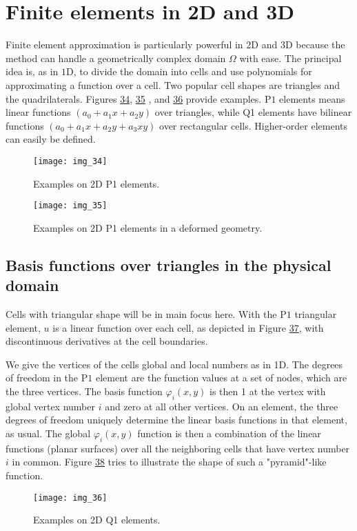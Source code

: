 \documentclass[../main.tex]{subfiles}
\begin{document}
\chapter{Finite elements in 2D and 3D}
	\label{chap:chap_9}
	\noindent Finite element approximation is particularly powerful in $2 \mathrm{D}$ and 3D because the method can handle a geometrically complex domain $\Omega$ with ease. The principal idea is, as in $1 \mathrm{D}$, to divide the domain into cells and use polynomials for approximating a function over a cell. Two popular cell shapes are triangles and the quadrilaterals. Figures \hyperref[fig:img_34]{34}, \hyperref[fig:img_35]{35} , and \hyperref[fig:img_36]{36} provide examples. $\mathrm{P} 1$ elements means linear functions $\left(a_{0}+a_{1} x+a_{2} y\right)$ over triangles, while Q1 elements have bilinear functions $\left(a_{0}+a_{1} x+a_{2} y+a_{3} x y\right)$ over rectangular cells. Higher-order elements can easily be defined.
	\begin{figure}[H]
		\centering
		\texttt{[image: img\_34]}
		\caption{Examples on 2D P1 elements.}
		\label{fig:img_34}
	\end{figure}
	\begin{figure}[H]
		\centering
		\texttt{[image: img\_35]}
		\caption{Examples on 2D P1 elements in a deformed geometry.}
		\label{fig:img_35}
	\end{figure}
	\section[Basis functions over triangles in the physical domain]{Basis functions over triangles in the physical domain}
	\label{sec:sec_9_1}
	\noindent Cells with triangular shape will be in main focus here. With the $\mathrm{P} 1$ triangular element, $u$ is a linear function over each cell, as depicted in Figure \hyperref[fig:img_37]{37}, with discontinuous derivatives at the cell boundaries.
	
	We give the vertices of the cells global and local numbers as in 1D. The degrees of freedom in the $\mathrm{P} 1$ element are the function values at a set of nodes, which are the three vertices. The basis function $\varphi_{i}(x, y)$ is then 1 at the vertex with global vertex number $i$ and zero at all other vertices. On an element, the three degrees of freedom uniquely determine the linear basis functions in that element, as usual. The global $\varphi_{i}(x, y)$ function is then a combination of the linear functions (planar surfaces) over all the neighboring cells that have vertex number $i$ in common. Figure \hyperref[fig:img_38]{38} tries to illustrate the shape of such a "pyramid"-like function.
	\begin{figure}[H]
		\centering
		\texttt{[image: img\_36]}
		\caption{Examples on 2D Q1 elements.}
		\label{fig:img_36}
	\end{figure}
	
\end{document}
